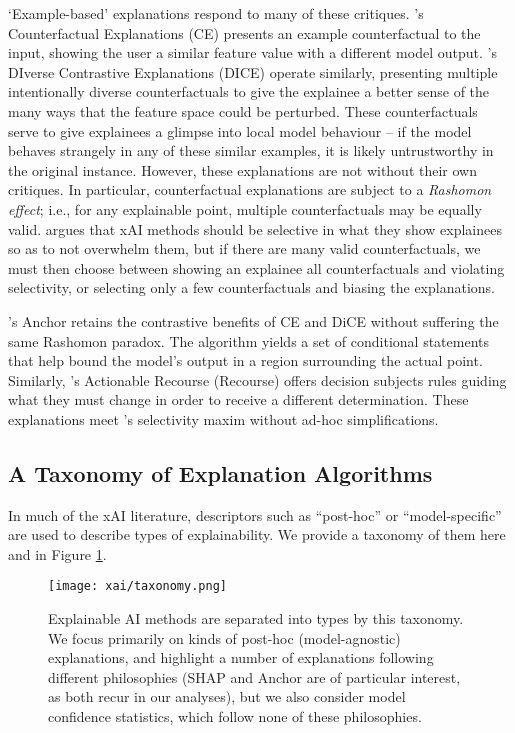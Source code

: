 `Example-based' explanations respond to many of these critiques. \textcite{wachter_counterfactual_2017}'s Counterfactual Explanations (CE) presents an example counterfactual to the input, showing the user a similar feature value with a different model output. \textcite{mothilal_explaining_2019}'s DIverse Contrastive Explanations (DICE) operate similarly, presenting multiple intentionally diverse counterfactuals to give the explainee a better sense of the many ways that the feature space could be perturbed. These counterfactuals serve to give explainees a glimpse into local model behaviour – if the model behaves strangely in any of these similar examples, it is likely untrustworthy in the original instance. However, these explanations are not without their own critiques. In particular, counterfactual explanations are subject to a \emph{Rashomon effect}; i.e., for any explainable point, multiple counterfactuals may be equally valid. \textcite{miller_explanation_2017} argues that xAI methods should be selective in what they show explainees so as to not overwhelm them, but if there are many valid counterfactuals, we must then choose between showing an explainee all counterfactuals and violating selectivity, or selecting only a few counterfactuals and biasing the explanations.

\textcite{ribeiro_anchors_2018}'s Anchor retains the contrastive benefits of CE and DiCE without suffering the same Rashomon paradox. The algorithm yields a set of conditional statements that help bound the model's output in a region surrounding the actual point. Similarly, \textcite{ustun_actionable_2019}'s Actionable Recourse (Recourse) offers decision subjects rules guiding what they must change in order to receive a different determination. These explanations meet \textcite{miller_explanation_2017}'s selectivity maxim without ad-hoc simplifications.

\subsection{A Taxonomy of Explanation Algorithms}
In much of the xAI literature, descriptors such as ``post-hoc'' or ``model-specific'' are used to describe types of explainability. We provide a taxonomy of them here and in Figure \ref{fig:taxonomy}.

\begin{figure}[htbp]
    \centering
    \texttt{[image: xai/taxonomy.png]}
    \caption{Explainable AI methods are separated into types by this taxonomy. We focus primarily on kinds of post-hoc (model-agnostic) explanations, and highlight a number of explanations following different philosophies (SHAP and Anchor are of particular interest, as both recur in our analyses), but we also consider model confidence statistics, which follow none of these philosophies.}
    \label{fig:taxonomy}
\end{figure}

